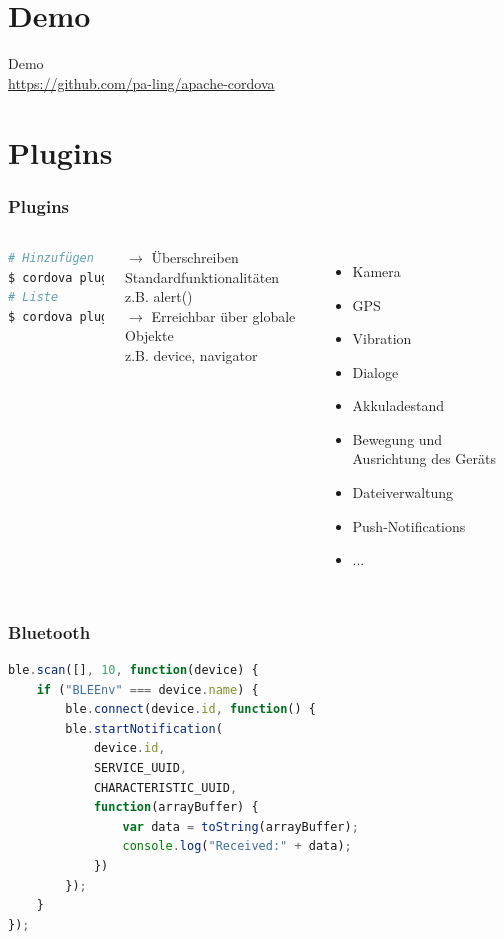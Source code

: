 \documentclass[xcolor=dvipsnames]{beamer}
\begin{document}
\section{Demo}
\begin{frame}
	\centering
	{\LARGE \textcolor{cordovablue}{Demo}}\\
	\vspace{4ex}
	\href{https://github.com/pa-ling/apache-cordova}{https://github.com/pa-ling/apache-cordova}
\end{frame}

\section{Plugins}
\begin{frame}[fragile]\frametitle{Plugins}
	\begin{columns}[t,onlytextwidth]
		\begin{lstlisting}[language=Python]
# Hinzufügen
$ cordova plugin add
# Liste
$ cordova plugin ls
		\end{lstlisting}
		$\rightarrow$ Überschreiben Standardfunktionalitäten 
		\\z.B. alert()\\
		$\rightarrow$ Erreichbar über globale Objekte
		\\z.B. device, navigator
		\begin{itemize}
			\item Kamera
			\item GPS
			\item Vibration
			\item Dialoge
			\item Akkuladestand
			\item Bewegung und Ausrichtung des Geräts
			\item Dateiverwaltung
			\item Push-Notifications
			\item ...
		\end{itemize}
	\end{columns}
\end{frame}

\begin{frame}[fragile]\frametitle{Bluetooth}
	\begin{lstlisting}[language=JavaScript]
ble.scan([], 10, function(device) {
	if ("BLEEnv" === device.name) {
		ble.connect(device.id, function() {
		ble.startNotification(
			device.id,
			SERVICE_UUID,
			CHARACTERISTIC_UUID, 
			function(arrayBuffer) {
				var data = toString(arrayBuffer);
				console.log("Received:" + data);
			})
		});
	}
});
	\end{lstlisting}
\end{frame}
\end{document}
